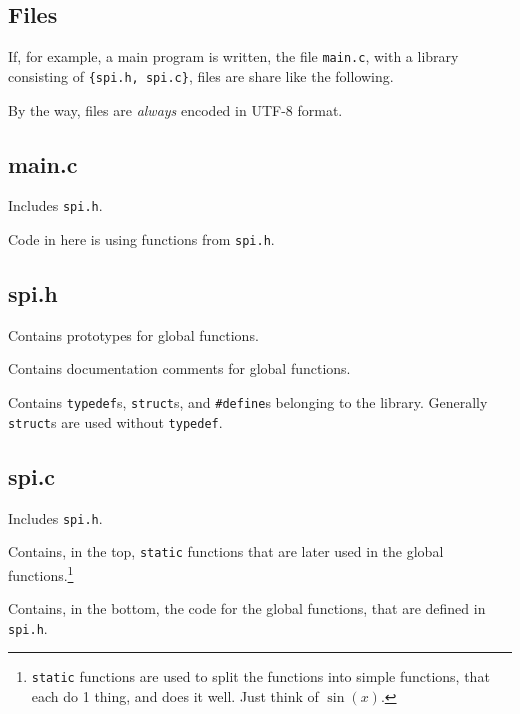 \documentclass[article, 10pt]{memoir}
\let\tempone\itemize
\let\temptwo\enditemize
\renewenvironment{itemize}{\tempone\firmlist}{\temptwo}
\begin{document}
\begin{multicols}{2}
    \chapter{Files}
    If, for example, a main program is written, the file \texttt{main.c}, with a library consisting of \texttt{\{spi.h, spi.c\}}, files are share like the following.

    By the way, files are \emph{always} encoded in UTF-8 format.

    \section{main.c}
    \begin{itemize}
    \item Includes \texttt{spi.h}.
    \item Code in here is using functions from \texttt{spi.h}.
    \end{itemize}

    \section{spi.h}
    \begin{itemize}
    \item Contains prototypes for global functions.
    \item Contains documentation comments for global functions.
    \item Contains \texttt{typedef}s, \texttt{struct}s, and \texttt{\#define}s belonging to the library. Generally \texttt{struct}s are used without \texttt{typedef}.
    \end{itemize}

    \section{spi.c}
    \begin{itemize}
    \item Includes \texttt{spi.h}.
    \item Contains, in the top, \texttt{static} functions that are later used in the global functions.\footnote{\texttt{static} functions are used to split the functions into simple functions, that each do 1 thing, and does it well. Just think of $\sin(x)$.}
    \item Contains, in the bottom, the code for the global functions, that are defined in \texttt{spi.h}.
    \end{itemize}
\end{multicols}
\end{document}
